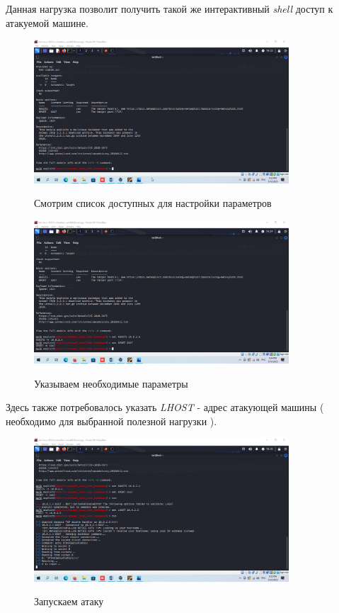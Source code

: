 \documentclass[a4paper]{article}
\begin{document}
  Данная нагрузка позволит получить такой же интерактивный \textit{shell} доступ к атакуемой машине.

  \begin{figure}[H]
    \centering
    \includegraphics[width=0.85\textwidth]{04_0075}
    \label{img:74}
    \caption{Смотрим список доступных для настройки параметров}
  \end{figure}

  \begin{figure}[H]
    \centering
    \includegraphics[width=0.85\textwidth]{04_0076}
    \label{img:75}
    \caption{Указываем необходимые параметры}
  \end{figure}

  Здесь также потребовалось указать \textit{LHOST} - адрес атакующей машины (
    необходимо для выбранной полезной нагрузки
  ).

  \begin{figure}[H]
    \centering
    \includegraphics[width=0.85\textwidth]{04_0077}
    \label{img:76}
    \caption{Запускаем атаку}
  \end{figure}
\end{document}
